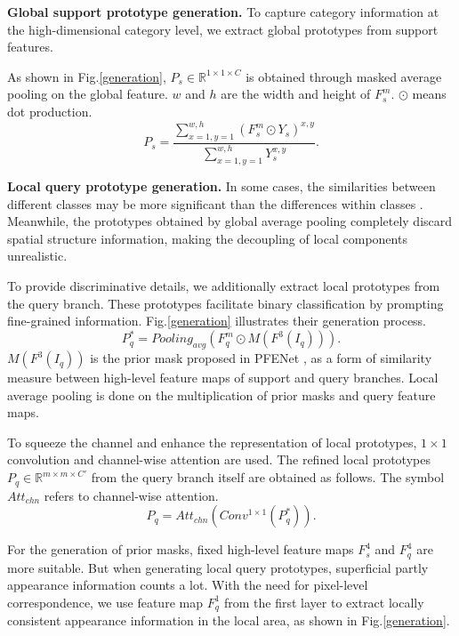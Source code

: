 \documentclass[letterpaper]{article} %
\begin{document}
\textbf{Global support prototype generation.}
To capture category information at the high-dimensional category level, we extract global prototypes from support features.

As shown in Fig.\ref{generation}, $P_{s} \in \mathbb{R}^{1\times 1\times C}$ is obtained through masked average pooling on the global feature. $w$ and $h$ are the width and height of $F^{m}_s$. $\odot$ means dot production.
\begin{equation}
P_{s} = \frac{\sum^{w,h}_{x=1,y=1}(F^{m}_s \odot Y_s)^{x,y}}{\sum^{w,h}_{x=1,y=1}Y_{s}^{x,y}}.
\end{equation}%

\textbf{Local query prototype generation.}
In some cases, the similarities between different classes may be more significant than the differences within classes \cite{fan2022self}. Meanwhile, the prototypes obtained by global average pooling completely discard spatial structure information, making the decoupling of local components unrealistic.

To provide discriminative details, we additionally extract local prototypes from the query branch. These prototypes facilitate binary classification by prompting fine-grained information. Fig.\ref{generation} illustrates their generation process.
\begin{equation}
P^*_{q} = Pooling_{avg}(F^{m}_q \odot M(F^3(I_q))).
\end{equation}%
$M(F^3(I_q))$ is the prior mask proposed in PFENet \cite{tian2020prior}, as a form of similarity measure between high-level feature maps of support and query branches. Local average pooling is done on the multiplication of prior masks and query feature maps.

To squeeze the channel and enhance the representation of local prototypes, $1\times1$ convolution and channel-wise attention are used. The refined local prototypes $P_{q} \in \mathbb{R}^{m\times m\times C'}$ from the query branch itself are obtained as follows. The symbol $Att_{chn}$ refers to channel-wise attention.
\begin{equation}
P_{q} = Att_{chn}(Conv^{1\times 1}(P^*_{q})).
\end{equation}%

For the generation of prior masks, fixed high-level feature maps $F^{4}_{s}$ and $F^{4}_{q}$ are more suitable. But when generating local query prototypes, superficial partly appearance information counts a lot. With the need for pixel-level correspondence, we use feature map $F^{1}_{q}$ from the first layer to extract locally consistent appearance information in the local area, as shown in Fig.\ref{generation}.
\end{document}
